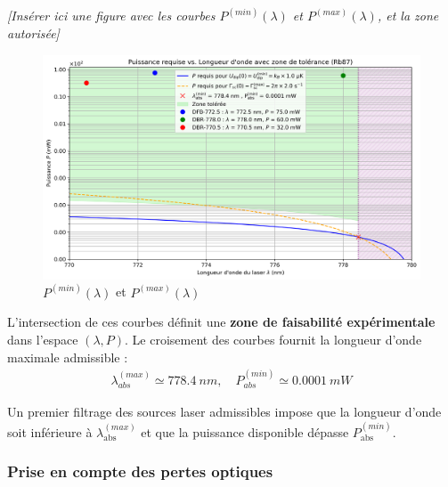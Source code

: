 \begin{center}
\textit{[Insérer ici une figure avec les courbes $P^{(min)}(\lambda)$ et $P^{(max)}(\lambda)$, et la zone autorisée]}
\end{center}

\begin{figure}[H]
    \centering
    \includegraphics[width=0.7\linewidth]{figures/07_Dipolaire/puissance_vs_lambda_log.png}
    \caption{$P^{(min)}(\lambda)$ et $P^{(max)}(\lambda)$}
\end{figure}

L’intersection de ces courbes définit une {\bf zone de faisabilité expérimentale} dans l’espace $(\lambda, P)$. Le croisement des courbes fournit la longueur d’onde maximale admissible :
\begin{eqnarray*}
	\lambda^{(max)}_{abs} \simeq 778.4~nm , \quad P^{(min)}_{abs} \simeq 0.0001 ~ mW
\end{eqnarray*}

Un premier filtrage des sources laser admissibles impose que la longueur d’onde soit inférieure à $\lambda^{(max)}_{\text{abs}}$ et que la puissance disponible dépasse $P^{(min)}_{\text{abs}}$.

%

\subsubsection*{Prise en compte des pertes optiques}


